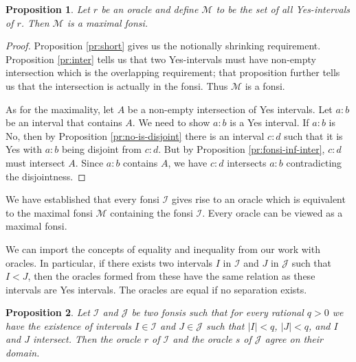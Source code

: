 \documentclass[12pt]{article}
\newtheorem{proposition}{Proposition}[subsection]
\begin{document}
\begin{proposition} Let $r$ be an oracle and define $\mathcal{M}$ to be the set of all Yes-intervals of $r$. Then $\mathcal{M}$ is a maximal fonsi. 
\end{proposition}

\begin{proof}
     Proposition \ref{pr:short} gives us the notionally shrinking requirement. Proposition \ref{pr:inter} tells us that two Yes-intervals must have non-empty intersection which is the overlapping requirement; that proposition further tells us that the intersection is actually in the fonsi. Thus $\mathcal{M}$ is a fonsi. 

     As for the maximality, let $A$ be a non-empty intersection of Yes intervals. Let $a:b$ be an interval that contains $A$. We need to show $a:b$ is a Yes interval. If $a:b$ is No, then by Proposition \ref{pr:no-is-disjoint} there is an interval $c:d$ such that it is Yes with $a:b$ being disjoint from $c:d$. But by Proposition \ref{pr:fonsi-inf-inter}, $c:d$ must intersect $A$. Since $a:b$ contains $A$, we have $c:d$ intersects $a:b$ contradicting the disjointness. 
\end{proof}

We have established that every fonsi $\mathcal{I}$ gives rise to an oracle which is equivalent to the maximal fonsi $\mathcal{M}$ containing the fonsi $\mathcal{I}$. Every oracle can be viewed as a maximal fonsi.

We can import the concepts of equality and inequality from our work with oracles. In particular, if there exists two intervals $I$ in $\mathcal{I}$ and $J$ in $\mathcal{J}$ such that $I < J$, then the oracles formed from these have the same relation as these intervals are Yes intervals. The oracles are equal if no separation exists. 

\begin{proposition}\label{pr:fonsi-inter}
Let $\mathcal{I}$ and $\mathcal{J}$ be two fonsis such that for every rational $q>0$ we have the existence of intervals $I \in \mathcal{I}$ and $J \in \mathcal{J}$ such that $|I| <q$, $|J| < q$, and $I$ and $J$ intersect. Then the oracle $r$ of $\mathcal{I}$ and the oracle $s$ of $\mathcal{J}$ agree on their domain. 
\end{proposition}
\end{document}
